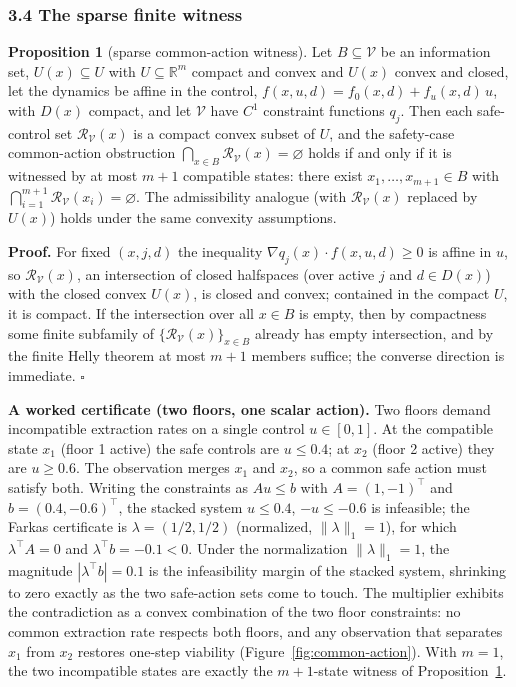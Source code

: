 \documentclass[10pt,twocolumn]{article}
\theoremstyle{definition}
\newtheorem{proposition}{Proposition}
\begin{document}
\subsubsection{3.4 The sparse finite
witness}\label{the-sparse-finite-witness}

\begin{proposition}[sparse common-action witness]\label{prop:helly}
Let \(B\subseteq\mathcal V\) be an information set, \(U(x)\subseteq U\)
with \(U\subseteq\mathbb R^m\) compact and convex and \(U(x)\) convex and
closed, let the dynamics be affine in the control,
\(f(x,u,d)=f_0(x,d)+f_u(x,d)\,u\), with \(D(x)\) compact, and let
\(\mathcal V\) have \(C^1\) constraint functions \(q_j\). Then each
safe-control set \(\mathcal R_{\mathcal V}(x)\) is a compact convex
subset of \(U\), and the safety-case common-action obstruction
\(\bigcap_{x\in B}\mathcal R_{\mathcal V}(x)=\varnothing\) holds if and
only if it is witnessed by at most \(m+1\) compatible states: there
exist \(x_1,\dots,x_{m+1}\in B\) with
\(\bigcap_{i=1}^{m+1}\mathcal R_{\mathcal V}(x_i)=\varnothing\). The
admissibility analogue (with \(\mathcal R_{\mathcal V}(x)\) replaced by
\(U(x)\)) holds under the same convexity assumptions.
\end{proposition}

\textbf{Proof.} For fixed \((x,j,d)\) the inequality
\(\nabla q_j(x)\cdot f(x,u,d)\ge 0\) is affine in \(u\), so
\(\mathcal R_{\mathcal V}(x)\), an intersection of closed halfspaces
(over active \(j\) and \(d\in D(x)\)) with the closed convex \(U(x)\),
is closed and convex; contained in the compact \(U\), it is compact. If
the intersection over all \(x\in B\) is empty, then by compactness some
finite subfamily of \(\{\mathcal R_{\mathcal V}(x)\}_{x\in B}\) already
has empty intersection, and by the finite Helly theorem at most \(m+1\)
members suffice; the converse direction is immediate. \hfill\(\square\)

\textbf{A worked certificate (two floors, one scalar action).} Two
floors demand incompatible extraction rates on a single control
\(u\in[0,1]\). At the compatible state \(x_1\) (floor 1 active) the safe
controls are \(u\le 0.4\); at \(x_2\) (floor 2 active) they are
\(u\ge 0.6\). The observation merges \(x_1\) and \(x_2\), so a common
safe action must satisfy both. Writing the constraints as \(Au\le b\)
with \(A=(1,-1)^{\top}\) and \(b=(0.4,-0.6)^{\top}\), the stacked system
\(u\le 0.4\), \(-u\le -0.6\) is infeasible; the Farkas certificate is
\(\lambda=(1/2,1/2)\) (normalized, \(\|\lambda\|_1=1\)), for which
\(\lambda^{\top}A=0\) and \(\lambda^{\top}b=-0.1<0\). Under the normalization
\(\|\lambda\|_1=1\), the magnitude \(|\lambda^{\top}b|=0.1\) is the
infeasibility margin of the stacked system, shrinking to zero exactly as
the two safe-action sets come to touch. The multiplier
exhibits the contradiction as a convex combination of the two floor
constraints: no common extraction rate respects both floors, and any
observation that separates \(x_1\) from \(x_2\) restores one-step
viability (Figure~\ref{fig:common-action}). With \(m=1\), the two
incompatible states are exactly the \(m+1\)-state witness of
Proposition~\ref{prop:helly}.
\end{document}
